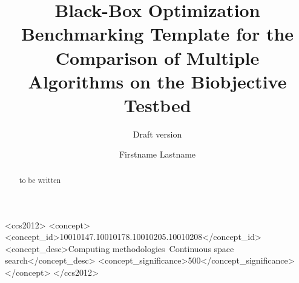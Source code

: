 \documentclass[sigconf]{acmart}
\begin{document}
\title{Black-Box Optimization Benchmarking Template for the Comparison of Multiple Algorithms on the Biobjective \bbobbiobj Testbed}
\renewcommand{\shorttitle}{Template to Compare Multiple Algorithms on the \bbobbiobj Testbed}
\subtitle{Draft version}



\author{Firstname Lastname}
%
%
%
%
%
%
%

\renewcommand{\shortauthors}{Firstname Lastname et. al.}


\begin{abstract}
to be written
\end{abstract}


%
%
 \begin{CCSXML}
<ccs2012>
<concept>
<concept_id>10010147.10010178.10010205.10010208</concept_id>
<concept_desc>Computing methodologies~Continuous space search</concept_desc>
<concept_significance>500</concept_significance>
</concept>
</ccs2012>
\end{CCSXML}
\end{document}
